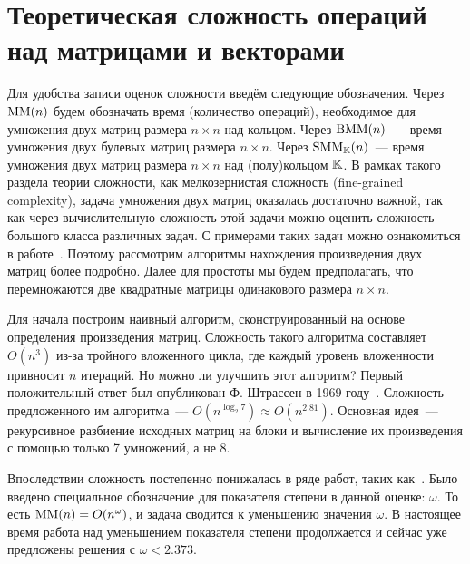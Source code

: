 \section{Теоретическая сложность операций над матрицами и векторами}
\label{sec:TheoreticalComplexity}


Для удобства записи оценок сложности введём следующие обозначения.
Через $\operatorname{MM}(n)$ будем обозначать время (количество операций), необходимое для умножения двух матриц размера $n \times n$ над кольцом.
Через $\operatorname{BMM}(n)$~--- время умножения двух булевых матриц размера $n \times n$.
Через $\operatorname{SMM}_{\mathbb{K}}(n)$~--- время умножения двух матриц размера $n \times n$ над (полу)кольцом $\mathbb{K}$.
В рамках такого раздела теории сложности, как мелкозернистая сложность (fine-grained complexity), задача умножения двух матриц оказалась достаточно важной, так как через вычислительную сложность этой задачи можно оценить сложность большого класса различных задач.
С примерами таких задач можно ознакомиться в работе~. Поэтому рассмотрим алгоритмы нахождения произведения двух матриц более подробно.
Далее для простоты мы будем предполагать, что перемножаются две квадратные матрицы одинакового размера $n \times n$.

Для начала построим наивный алгоритм, сконструированный на основе определения произведения матриц.
Сложность такого алгоритма составляет $O(n^3)$ из-за тройного вложенного цикла, где каждый уровень вложенности привносит $n$ итераций.
Но можно ли улучшить этот алгоритм?
Первый положительный ответ был опубликован Ф. Штрассен в 1969 году~.
Сложность предложенного им алгоритма~--- $O(n^{\log_2 7}) \approx O(n^{2.81})$.
Основная идея~--- рекурсивное разбиение исходных матриц на блоки и вычисление их произведения с помощью только 7 умножений, а не 8.


Впоследствии сложность постепенно понижалась в ряде работ, таких как~\cite{Pan1978,BiniCapoRoma1979,Schonhage1981,CoppWino1982,CoppWino1990}.
Было введено специальное обозначение для показателя степени в данной оценке: $\omega$.
То есть $\operatorname{MM}(n) = O(n^\omega)$, и задача сводится к уменьшению значения $\omega$.
В настоящее время работа над уменьшением показателя степени продолжается и сейчас уже предложены решения%
%
 с $\omega < 2.373$.

